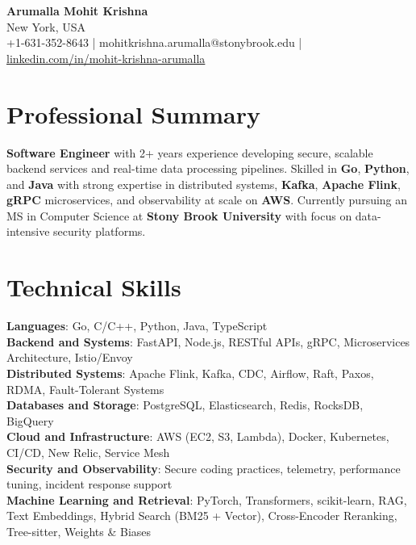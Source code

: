 \documentclass[letterpaper,11pt]{article}
\begin{document}
\begin{center}
  {\Large \textbf{Arumalla Mohit Krishna}} \\
  New York, USA \\
  +1-631-352-8643 \enspace | \enspace mohitkrishna.arumalla@stonybrook.edu \enspace | \enspace \href{https://www.linkedin.com/in/mohit-krishna-arumalla}{linkedin.com/in/mohit-krishna-arumalla}
\end{center}

\section{Professional Summary}
  \begin{itemize}[leftmargin=0.15in, label={}]
    \small{\item{
     \textbf{Software Engineer} with 2+ years experience developing secure, scalable backend services and real-time data processing pipelines. Skilled in \textbf{Go}, \textbf{Python}, and \textbf{Java} with strong expertise in distributed systems, \textbf{Kafka}, \textbf{Apache Flink}, \textbf{gRPC} microservices, and observability at scale on \textbf{AWS}. Currently pursuing an MS in Computer Science at \textbf{Stony Brook University} with focus on data-intensive security platforms.
    }}
  \end{itemize}
\vspace{-16pt}

\section{Technical Skills}
 \begin{itemize}[leftmargin=0.15in, label={}]
    \small{\item{
     \textbf{Languages}: Go, C/C++, Python, Java, TypeScript \\
     \textbf{Backend and Systems}: FastAPI, Node.js, RESTful APIs, gRPC, Microservices Architecture, Istio/Envoy \\
     \textbf{Distributed Systems}: Apache Flink, Kafka, CDC, Airflow, Raft, Paxos, RDMA, Fault-Tolerant Systems \\
     \textbf{Databases and Storage}: PostgreSQL, Elasticsearch, Redis, RocksDB, BigQuery \\
     \textbf{Cloud and Infrastructure}: AWS (EC2, S3, Lambda), Docker, Kubernetes, CI/CD, New Relic, Service Mesh \\
     \textbf{Security and Observability}: Secure coding practices, telemetry, performance tuning, incident response support \\
     \textbf{Machine Learning and Retrieval}: PyTorch, Transformers, scikit-learn, RAG, Text Embeddings, Hybrid Search (BM25 + Vector), Cross-Encoder Reranking, Tree-sitter, Weights \& Biases
    }}
 \end{itemize}
\vspace{-16pt}
\end{document}
